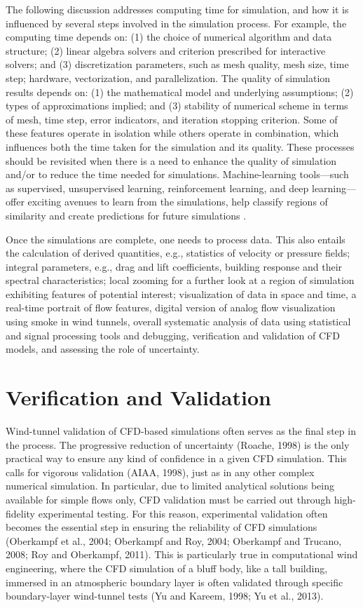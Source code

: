 The following discussion addresses computing time for simulation, and how it is influenced by several steps involved in the simulation process. For example, the computing time depends on: (1) the choice of numerical algorithm and data structure; (2) linear algebra solvers and criterion prescribed for interactive solvers; and (3) discretization parameters, such as mesh quality, mesh size, time step; hardware, vectorization, and parallelization. The quality of simulation results depends on: (1) the mathematical model and underlying assumptions; (2) types of approximations implied; and (3) stability of numerical scheme in terms of mesh, time step, error indicators, and iteration stopping criterion. Some of these features operate in isolation while others operate in combination, which influences both the time taken for the simulation and its quality. These processes should be revisited when there is a need to enhance the quality of simulation and/or to reduce the time needed for simulations. Machine-learning tools—such as supervised, unsupervised learning, reinforcement learning, and deep learning—offer exciting avenues to learn from the simulations, help classify regions of similarity and create predictions for future simulations \citep{kareem2019generalized}.

Once the simulations are complete, one needs to process data. This also entails the calculation of derived quantities, e.g., statistics of velocity or pressure fields; integral parameters, e.g., drag and lift coefficients, building response and their spectral characteristics; local zooming for a further look at a region of simulation exhibiting features of potential interest; visualization of data in space and time, a real-time portrait of flow features, digital version of analog flow visualization using smoke in wind tunnels, overall systematic analysis of data using statistical and signal processing tools and debugging, verification and validation of CFD models, and assessing the role of uncertainty.

\section{Verification and Validation}
\label{sec:resp_cfd_wind_flow_modeling}

Wind-tunnel validation of CFD-based simulations often serves as the final step in the process. The progressive reduction of uncertainty (Roache, 1998) is the only practical way to ensure any kind of confidence in a given CFD simulation. This calls for vigorous validation (AIAA, 1998), just as in any other complex numerical simulation. In particular, due to limited analytical solutions being available for simple flows only, CFD validation must be carried out through high-fidelity experimental testing. For this reason, experimental validation often becomes the essential step in ensuring the reliability of CFD simulations (Oberkampf et al., 2004; Oberkampf and Roy, 2004; Oberkampf and Trucano, 2008; Roy and Oberkampf, 2011). This is particularly true in computational wind engineering, where the CFD simulation of a bluff body, like a tall building, immersed in an atmospheric boundary layer is often validated through specific boundary-layer wind-tunnel tests (Yu and Kareem, 1998; Yu et al., 2013).

